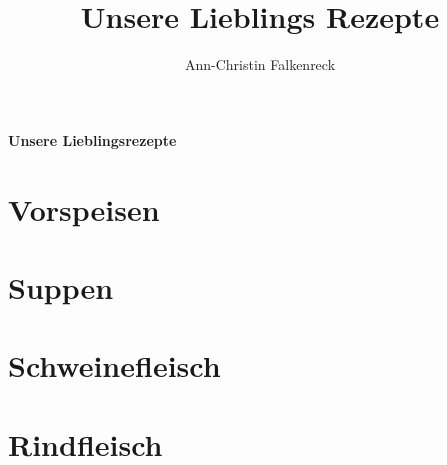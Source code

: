 \documentclass[ngerman,12pt,parskip=half]{scrbook}
\author{Ann-Christin Falkenreck}
\title{Unsere Lieblings Rezepte}
\begin{document}
	\begin{titlepage}
		
	\vspace* {7cm}
		
	\begin{center}
		{\bfseries\huge Unsere Lieblingsrezepte }
	\end{center}
	
		
		

	\end{titlepage}
	
\tableofcontents

	
\chapter{Vorspeisen}

\clearpage
		
\chapter{Suppen}	

\clearpage

\chapter{Schweinefleisch}

\clearpage

\chapter{Rindfleisch}

\clearpage
\end{document}
